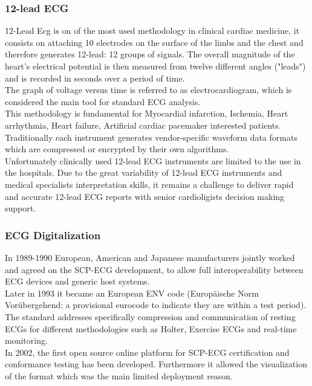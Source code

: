 \subsubsection{12-lead ECG}
12-Lead Ecg is on of the most used methodology in clinical cardiac medicine, it consists on attaching 10 electrodes on the surface of the limbs and the chest and therefore generates 12-lead: 12 groups of signals. The overall magnitude of the heart's electrical potential is then measured from twelve different angles ("leads") and is recorded in seconds over a period of time.\\
The graph of voltage versus time is referred to as electrocardiogram, which is considered the main tool for standard ECG analysis. \cite{electrocardiography_it} \cite{electrocardiography_en}\\
This methodology is fundamental for Myocardial infarction, Ischemia, Heart arrhythmia, Heart failure, Artificial cardiac pacemaker interested patients.
Traditionally each instrument generates vendor-specific waveform data formats which are compressed or encrypted by their own algorithms.\\
Unfortunately clinically used 12-lead ECG instruments are limited to the use in the hospitals. Due to the great variability of 12-lead ECG instruments and medical specialists interpretation skills, it remains a challenge to deliver rapid and accurate 12-lead ECG reports with senior cardioligists decision making support.\cite{Hsieh2012}
  


\subsubsection{ECG Digitalization}
In 1989-1990 European, American and Japanese manufacturers jointly worked and agreed on the SCP-ECG development, to allow full interoperability between ECG devices and generic host systems.\\
Later in 1993 it became an European ENV code (Europäische Norm Vorübergehend: a provisional eurocode to indicate they are within a test period).\\
The standard addresses specifically compression and communication of resting ECGs for different methodologies such as Holter, Exercise ECGs and real-time monitoring.\\
In 2002, the first open source online platform for SCP-ECG certification and conformance testing has been developed. Furthermore it allowed the visualization of the format which was the main limited deployment reason.\cite{Chronaki}\\

